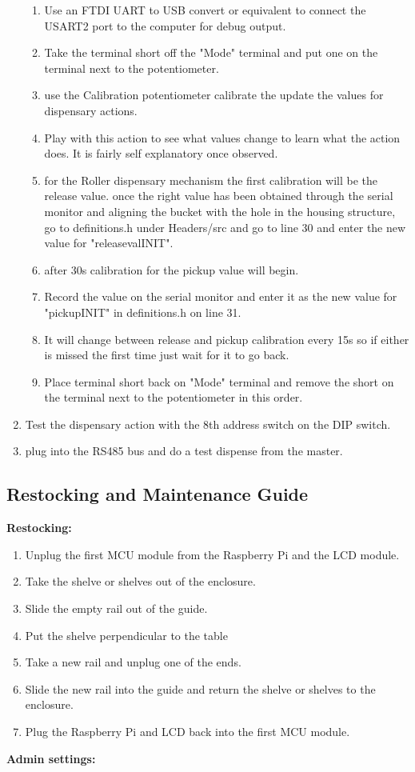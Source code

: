 \documentclass[a4paper,11pt]{article}
\numberwithin{figure}{section}
\numberwithin{table}{section}
\begin{document}
\begin{appendices}
\begin{enumerate}
{\begin{enumerate}
  \item Use an FTDI UART to USB convert or equivalent to connect the USART2 port to the computer for debug output.
  \item Take the terminal short off the "Mode" terminal and put one on the terminal next to the potentiometer.
  \item use the Calibration potentiometer calibrate the update the values for dispensary actions. 
  \item Play with this action to see what values change to learn what the action does. It is fairly self explanatory once observed.
  \item for the Roller dispensary mechanism the first calibration will be the release value. once the right value has been obtained through the serial monitor and aligning the bucket with the hole in the housing structure, go to definitions.h under Headers/src and go to line 30 and enter the new value for "releasevalINIT".
  \item after 30s calibration for the pickup value will begin.
  \item Record the value on the serial monitor and enter it as the new value for "pickupINIT" in definitions.h on line 31.
  \item It will change between release and pickup calibration every 15s so if either is missed the first time just wait for it to go back.
  \item Place terminal short back on "Mode" terminal and remove the short on the terminal next to the potentiometer in this order.
  \end{enumerate}}
  \item Test the dispensary action with the 8th address switch on the DIP switch.
  \item plug into the RS485 bus and do a test dispense from the master.
\end{enumerate}

\subsection{Restocking and Maintenance Guide}
\label{subsec:maintenace}
\textbf{Restocking:}
\begin{enumerate}
\item Unplug the first MCU module from the Raspberry Pi and the LCD module.
\item Take the shelve or shelves out of the enclosure.
\item Slide the empty rail out of the guide.
\item Put the shelve perpendicular to the table
\item Take a new rail and unplug one of the ends.
\item Slide the new rail into the guide and return the shelve or shelves to the enclosure.
\item Plug the Raspberry Pi and LCD back into the first MCU module.
\end{enumerate}
\textbf{Admin settings:}


\end{appendices}
\end{document}
